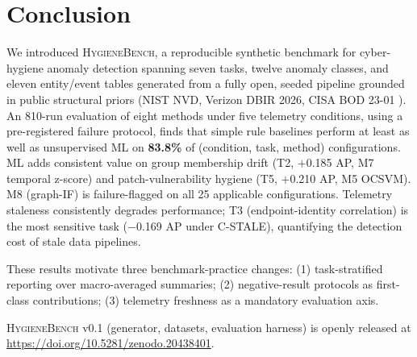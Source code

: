 \documentclass[conference]{IEEEtran}
\newcommand{\hb}{\textsc{HygieneBench}\xspace}
\begin{document}
\section{Conclusion}
\label{sec:conclusion}

We introduced \hb, a reproducible synthetic benchmark for cyber-hygiene anomaly
detection spanning seven tasks, twelve anomaly classes, and eleven entity/event
tables generated from a fully open, seeded pipeline grounded in public structural
priors (NIST NVD, Verizon DBIR 2026, CISA BOD 23-01 \cite{cisa_bod2301_2022}).
An 810-run evaluation of eight methods under five telemetry conditions, using a
pre-registered failure protocol, finds that simple rule baselines perform at least
as well as unsupervised ML on \textbf{83.8\%} of (condition, task, method)
configurations. ML adds consistent value on group membership drift (T2, $+$0.185 AP,
M7 temporal z-score) and patch-vulnerability hygiene (T5, $+$0.210 AP, M5 OCSVM).
M8 (graph-IF) is failure-flagged on all 25 applicable configurations. Telemetry
staleness consistently degrades performance; T3 (endpoint-identity correlation) is
the most sensitive task ($-$0.169 AP under C-STALE), quantifying the detection cost
of stale data pipelines.

These results motivate three benchmark-practice changes: (1) task-stratified
reporting over macro-averaged summaries; (2) negative-result protocols as
first-class contributions; (3) telemetry freshness as a mandatory evaluation axis.

\hb v0.1 (generator, datasets, evaluation harness) is openly released at
\url{https://doi.org/10.5281/zenodo.20438401}.

\balance


\end{document}
